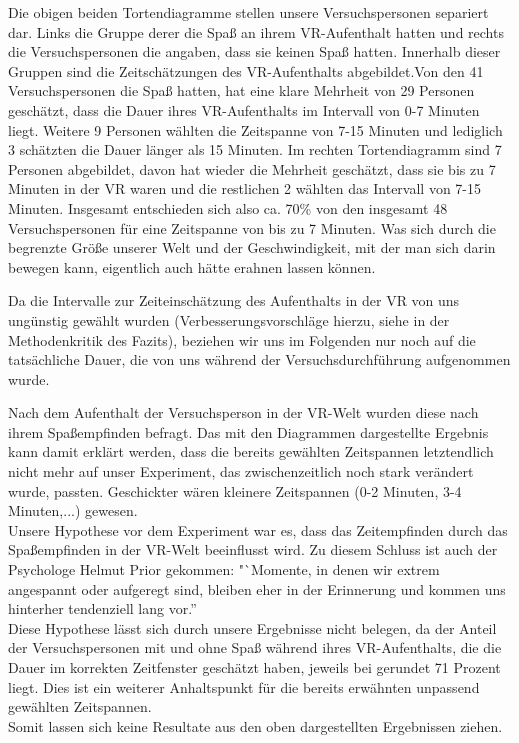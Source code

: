 \documentclass{Paper}
\begin{document}
Die obigen beiden Tortendiagramme stellen unsere Versuchspersonen separiert dar. Links die Gruppe derer die Spaß an ihrem VR-Aufenthalt hatten und rechts die Versuchspersonen die angaben, dass sie keinen Spaß hatten. Innerhalb dieser Gruppen sind die Zeitschätzungen des VR-Aufenthalts abgebildet.Von den 41 Versuchspersonen die Spaß hatten, hat eine klare Mehrheit von 29 Personen geschätzt, dass die Dauer ihres VR-Aufenthalts im Intervall von 0-7 Minuten liegt. Weitere 9 Personen wählten die Zeitspanne von 7-15 Minuten und lediglich 3 schätzten die Dauer länger als 15 Minuten. Im rechten Tortendiagramm sind 7 Personen abgebildet, davon hat wieder die Mehrheit geschätzt, dass sie bis zu 7 Minuten in der VR waren und die restlichen 2 wählten das Intervall von 7-15 Minuten. Insgesamt entschieden sich also ca. 70\% von den insgesamt 48 Versuchspersonen für eine Zeitspanne von bis zu 7 Minuten. Was sich durch die begrenzte Größe unserer Welt und der Geschwindigkeit, mit der man sich darin bewegen kann, eigentlich auch hätte erahnen lassen können.

Da die Intervalle zur Zeiteinschätzung des Aufenthalts in der VR von uns ungünstig gewählt wurden (Verbesserungsvorschläge hierzu, siehe in der Methodenkritik des Fazits), beziehen wir uns im Folgenden nur noch auf die tatsächliche Dauer, die von uns während der Versuchsdurchführung aufgenommen wurde.

Nach dem Aufenthalt der Versuchsperson in der VR-Welt wurden diese nach ihrem Spaßempfinden befragt. Das mit den Diagrammen dargestellte Ergebnis kann damit erklärt werden, dass die bereits gewählten Zeitspannen letztendlich nicht mehr auf unser Experiment, das zwischenzeitlich noch stark verändert wurde, passten. Geschickter wären kleinere Zeitspannen (0-2 Minuten, 3-4 Minuten,...) gewesen.\\
Unsere Hypothese vor dem Experiment war es, dass das Zeitempfinden durch das Spaßempfinden in der VR-Welt beeinflusst wird. Zu diesem Schluss ist auch der Psychologe Helmut Prior gekommen: "`Momente, in denen wir extrem angespannt oder aufgeregt sind, bleiben eher in der Erinnerung und kommen uns hinterher tendenziell lang vor.'' \cite{Irle2017} \\
Diese Hypothese lässt sich durch unsere Ergebnisse nicht belegen, da der Anteil der Versuchspersonen mit und ohne Spaß während ihres VR-Aufenthalts, die die Dauer im korrekten Zeitfenster geschätzt haben, jeweils bei gerundet 71 Prozent liegt. Dies ist ein weiterer Anhaltspunkt für die bereits erwähnten unpassend gewählten Zeitspannen.\\
Somit lassen sich keine Resultate aus den oben dargestellten Ergebnissen ziehen.
\end{document}
